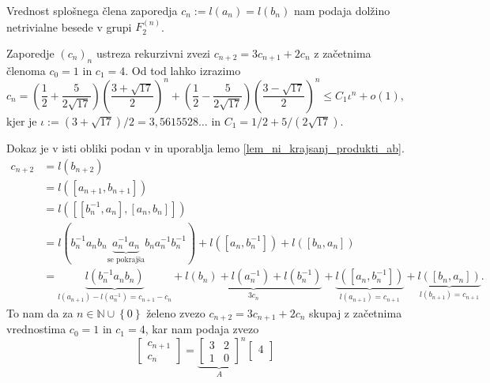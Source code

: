 \documentclass[mat1, tisk]{fmfdelo}
\numberwithin{equation}{section}  %
\begin{document}
Vrednost splošnega člena zaporedja $c_n := l(a_n) = l(b_n)$ nam podaja dolžino netrivialne besede v grupi $F_2^{(n)}$.
\begin{lema}
\label{lem_vrednost_cn}
Zaporedje $(c_n)_n$ ustreza rekurzivni zvezi $c_{n+2} = 3 c_{n+1} + 2c_{n}$ z začetnima členoma $c_0 = 1$ in $c_1 = 4$. Od tod lahko izrazimo \begin{equation*}
c_{n} = \left( \frac{1}{2} + \frac{5}{2 \sqrt{17}} \right) \left( \frac{3 + \sqrt{17} }{2} \right)^{n} +  \left( \frac{1}{2} - \frac{5}{2 \sqrt{17}} \right) \left( \frac{3 - \sqrt{17} }{2} \right)^{n} \le C_1 \iota^{n} + o(1),
\end{equation*}
kjer je $\iota := (3 + \sqrt{17} ) / 2 = 3{,}5615528 \ldots $ in $C_1 = 1/ 2 + 5 / (2 \sqrt{17} )$. 
\end{lema}  
\begin{dokaz}
    Dokaz je v isti obliki podan v \cite{Schneider_2016} in uporablja lemo \ref{lem_ni_krajsanj_produkti_ab}.
    \begin{align*}
        c_{n+2} &= l(b_{n+2}) \\
         &= l([a_{n + 1}, b_{n+1}])\\
         &= l([[b_n ^{-1}, a_{n}], [a_{n}, b_{n}]]) \\
         &= l(b_{n} ^{-1} a_{n} b_{n} \underbrace{a_{n} ^{-1} a_{n}}_{\text{se pokrajša}}  b_{n} a_{n} ^{-1} b_{n} ^{-1}) + l([a_{n}, b_{n} ^{-1}]) + l([b_{n}, a_{n}]) \\
         &= \underbrace{l(b_{n} ^{-1} a_{n} b_{n})}_{l(a_{n + 1}) - l(a_{n}^{-1}) = c_{n+1} - c_{n}}  + \underbrace{l(b_{n}) + l(a_{n} ^{-1}) + l(b_{n} ^{-1})}_{3 c_{n}}  + \underbrace{l([a_{n} , b_{n}^{-1}])}_{l(a_{n + 1}) = c_{n+1}}  + \underbrace{l([b_{n}, a_{n}])}_{l(b_{n+1}) = c_{n+1}}. 
    \end{align*}
    To nam da za $n \in \mathbb{N} \cup  \left\{ 0 \right\}$ želeno zvezo $c_{n+2} = 3 c_{n+1} + 2c_{n}$ skupaj z začetnima vrednostima $c_0 = 1$ in $c_1 = 4$, kar nam podaja zvezo \begin{equation*}
    \begin{bmatrix}
        c_{n+ 1}\\
        c_{n} 
    \end{bmatrix} = {\underbrace{\begin{bmatrix}
        3 & 2\\
        1 & 0
    \end{bmatrix}}_{A}}^{n}  \begin{bmatrix}
        4 \\

\end{bmatrix}
\end{equation*}
\end{dokaz}
\end{document}

